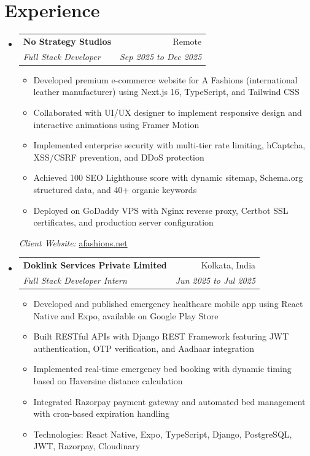 \documentclass[letterpaper,10pt]{article}
\makeatletter
\newcommand{\resumeItem}[1]{
    \item\small{#1 \vspace{-3pt}}
}
\newcommand{\resumeSubheading}[4]{
    \vspace{-3pt}\item
    \begin{tabular*}{0.97\textwidth}[t]{l@{\extracolsep{\fill}}r}
        \textbf{#1} & #2 \\
        \textit{\small#3} & \textit{\small #4} \\
    \end{tabular*}\vspace{-8pt}
}
\newcommand{\resumeSubHeadingListStart}{\begin{itemize}[leftmargin=0.15in, label={}]}
\newcommand{\resumeSubHeadingListEnd}{\end{itemize}}
\newcommand{\resumeItemListStart}{\begin{itemize}}
\newcommand{\resumeItemListEnd}{\end{itemize}\vspace{-6pt}}
\makeatother
\begin{document}
\vspace{-5pt}

\section{Experience}
    \resumeSubHeadingListStart
        \resumeSubheading
            {No Strategy Studios}{Remote}
            {Full Stack Developer}{Sep 2025 to Dec 2025}
            \resumeItemListStart
                \resumeItem{Developed premium e-commerce website for A Fashions (international leather manufacturer) using Next.js 16, TypeScript, and Tailwind CSS}
                \resumeItem{Collaborated with UI/UX designer to implement responsive design and interactive animations using Framer Motion}
                \resumeItem{Implemented enterprise security with multi-tier rate limiting, hCaptcha, XSS/CSRF prevention, and DDoS protection}
                \resumeItem{Achieved 100 SEO Lighthouse score with dynamic sitemap, Schema.org structured data, and 40+ organic keywords}
                \resumeItem{Deployed on GoDaddy VPS with Nginx reverse proxy, Certbot SSL certificates, and production server configuration}
            \resumeItemListEnd
            \vspace{5pt}
            \small{\textit{Client Website:} \href{https://www.afashions.net}{afashions.net}}

        \resumeSubheading
            {Doklink Services Private Limited}{Kolkata, India}
            {Full Stack Developer Intern}{Jun 2025 to Jul 2025}
            \resumeItemListStart
                \resumeItem{Developed and published emergency healthcare mobile app using React Native and Expo, available on Google Play Store}
                \resumeItem{Built RESTful APIs with Django REST Framework featuring JWT authentication, OTP verification, and Aadhaar integration}
                \resumeItem{Implemented real-time emergency bed booking with dynamic timing based on Haversine distance calculation}
                \resumeItem{Integrated Razorpay payment gateway and automated bed management with cron-based expiration handling}
                \resumeItem{Technologies: React Native, Expo, TypeScript, Django, PostgreSQL, JWT, Razorpay, Cloudinary}
            \resumeItemListEnd
            \vspace{5pt}
    \resumeSubHeadingListEnd
\end{document}

